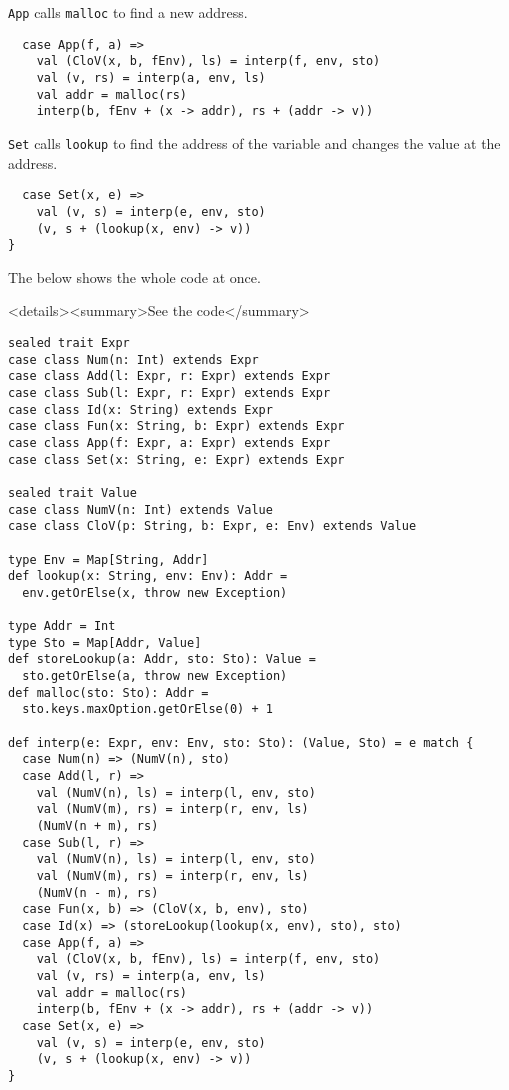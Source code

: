 \verb!App! calls \verb!malloc! to find a new address.

\begin{verbatim}
  case App(f, a) =>
    val (CloV(x, b, fEnv), ls) = interp(f, env, sto)
    val (v, rs) = interp(a, env, ls)
    val addr = malloc(rs)
    interp(b, fEnv + (x -> addr), rs + (addr -> v))
\end{verbatim}

\verb!Set! calls \verb!lookup! to find the address of the variable and changes the value at the address.

\begin{verbatim}
  case Set(x, e) =>
    val (v, s) = interp(e, env, sto)
    (v, s + (lookup(x, env) -> v))
}
\end{verbatim}

The below shows the whole code at once.

<details><summary>See the code</summary>

\begin{verbatim}
sealed trait Expr
case class Num(n: Int) extends Expr
case class Add(l: Expr, r: Expr) extends Expr
case class Sub(l: Expr, r: Expr) extends Expr
case class Id(x: String) extends Expr
case class Fun(x: String, b: Expr) extends Expr
case class App(f: Expr, a: Expr) extends Expr
case class Set(x: String, e: Expr) extends Expr

sealed trait Value
case class NumV(n: Int) extends Value
case class CloV(p: String, b: Expr, e: Env) extends Value

type Env = Map[String, Addr]
def lookup(x: String, env: Env): Addr =
  env.getOrElse(x, throw new Exception)

type Addr = Int
type Sto = Map[Addr, Value]
def storeLookup(a: Addr, sto: Sto): Value =
  sto.getOrElse(a, throw new Exception)
def malloc(sto: Sto): Addr =
  sto.keys.maxOption.getOrElse(0) + 1

def interp(e: Expr, env: Env, sto: Sto): (Value, Sto) = e match {
  case Num(n) => (NumV(n), sto)
  case Add(l, r) =>
    val (NumV(n), ls) = interp(l, env, sto)
    val (NumV(m), rs) = interp(r, env, ls)
    (NumV(n + m), rs)
  case Sub(l, r) =>
    val (NumV(n), ls) = interp(l, env, sto)
    val (NumV(m), rs) = interp(r, env, ls)
    (NumV(n - m), rs)
  case Fun(x, b) => (CloV(x, b, env), sto)
  case Id(x) => (storeLookup(lookup(x, env), sto), sto)
  case App(f, a) =>
    val (CloV(x, b, fEnv), ls) = interp(f, env, sto)
    val (v, rs) = interp(a, env, ls)
    val addr = malloc(rs)
    interp(b, fEnv + (x -> addr), rs + (addr -> v))
  case Set(x, e) =>
    val (v, s) = interp(e, env, sto)
    (v, s + (lookup(x, env) -> v))
}
\end{verbatim}

